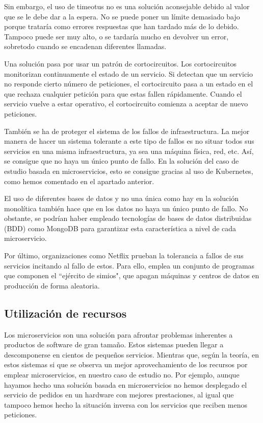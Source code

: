 \documentclass[11pt,spanish,listoffigures]{tfgetsinf}
\begin{document}
Sin embargo, el uso de timeotus no es una solución aconsejable debido al valor que se le debe dar a la espera. No se puede poner un límite demasiado bajo porque trataría como errores respuestas que han tardado más de lo debido. Tampoco puede ser muy alto, o se tardaría mucho en devolver un error, sobretodo cuando se encadenan diferentes llamadas.

Una solución pasa por usar un patrón de cortocircuitos. Los cortocircuitos monitorizan continuamente el estado de un servicio. Si detectan que un servicio no responde cierto número de peticiones, el cortocircuito pasa a un estado en el que rechaza cualquier petición para que estas fallen rápidamente. Cuando el servicio vuelve a estar operativo, el cortocircuito comienza a aceptar de nuevo peticiones. \cite{Richards2016}

También se ha de proteger el sistema de los fallos de infraestructura. La mejor manera de hacer un sistema tolerante a este tipo de fallos es no situar todos sus servicios en una misma infraestructura, ya sea una máquina física, red, etc. Así, se consigue que no haya un único punto de fallo. \cite{Newman2015a} En la solución del caso de estudio basada en microservicios, esto se consigue gracias al uso de Kubernetes, como hemos comentado en el apartado anterior.

El uso de diferentes bases de datos y no una única como hay en la solución monolítica también hace que en los datos no haya un único punto de fallo. No obstante, se podrían haber empleado tecnologías de bases de datos distribuidas (BDD) como MongoDB para garantizar esta característica a nivel de cada microservicio.

Por último, organizaciones como Netflix prueban la tolerancia a fallos de sus servicios incitando al fallo de estos. Para ello, emplea un conjunto de programas que componen el ``ejército de simios", que apagan máquinas y centros de datos en producción de forma aleatoria. \cite{Lewis2014}

\subsection{Utilización de recursos}

Los microservicios son una solución para afrontar problemas inherentes a productos de software de gran tamaño. Estos sistemas pueden llegar a descomponerse en cientos de pequeños servicios. Mientras que, según la teoría, en estos sistemas si que se observa un mejor aprovechamiento de los recursos por emplear microservicios, \cite{DelaTorre2018} en nuestro caso de estudio no. Por ejemplo, aunque hayamos hecho una solución basada en microservicios no hemos desplegado el servicio de pedidos en un hardware con mejores prestaciones, al igual que tampoco hemos hecho la situación inversa con los servicios que reciben menos peticiones.
\end{document}
